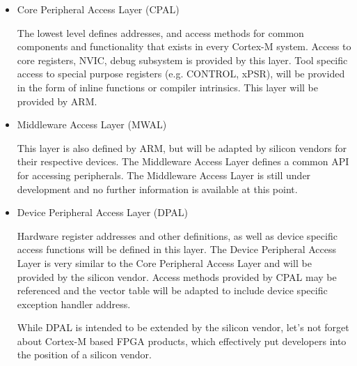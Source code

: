 \begin{itemize}
\item Core Peripheral Access Layer (CPAL)

The lowest level defines addresses, and access methods for common components and
functionality that exists in every Cortex-M system. Access to core registers,
NVIC, debug subsystem is provided by this layer. Tool specific access to special
purpose registers (e.g. CONTROL, xPSR), will be provided in the form of inline
functions or compiler intrinsics. This layer will be provided by ARM.


\item Middleware Access Layer (MWAL)

This layer is also defined by ARM, but will be adapted by silicon vendors for
their respective devices.
The Middleware Access Layer defines a common API for accessing peripherals. The
Middleware Access Layer is still under development and no further information is
available at this point.


\item Device Peripheral Access Layer (DPAL)

Hardware register addresses and other definitions, as well as device specific
access functions will be defined in this layer. The Device Peripheral Access
Layer is very similar to the Core Peripheral Access Layer and will be provided
by the silicon vendor. Access methods provided by CPAL may be referenced and the
vector table will be adapted to include device specific exception handler
address.


While DPAL is intended to be extended by the silicon vendor, let’s not forget
about Cortex-M based FPGA products, which effectively put developers into the
position of a silicon vendor.


\end{itemize}

